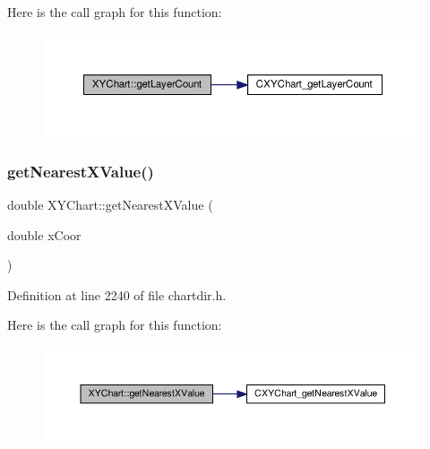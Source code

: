 Here is the call graph for this function\+:
\nopagebreak
\begin{figure}[H]
\begin{center}
\leavevmode
\includegraphics[width=350pt]{class_x_y_chart_a46dc94fc5ac9a9d037e11c5d23e7b89a_cgraph}
\end{center}
\end{figure}
\mbox{\label{class_x_y_chart_aa801760de768b3e3abc5b1ad97f2ce58}} 
\subsubsection{\texorpdfstring{get\+Nearest\+X\+Value()}{getNearestXValue()}}
{\footnotesize\ttfamily double X\+Y\+Chart\+::get\+Nearest\+X\+Value (\begin{DoxyParamCaption}\item[{double}]{x\+Coor }\end{DoxyParamCaption})\hspace{0.3cm}{\ttfamily [inline]}}



Definition at line 2240 of file chartdir.\+h.

Here is the call graph for this function\+:
\nopagebreak
\begin{figure}[H]
\begin{center}
\leavevmode
\includegraphics[width=350pt]{class_x_y_chart_aa801760de768b3e3abc5b1ad97f2ce58_cgraph}
\end{center}
\end{figure}
\mbox{\label{class_x_y_chart_a7159f46e6ac9491d9f373f81b7a4632b}} 
